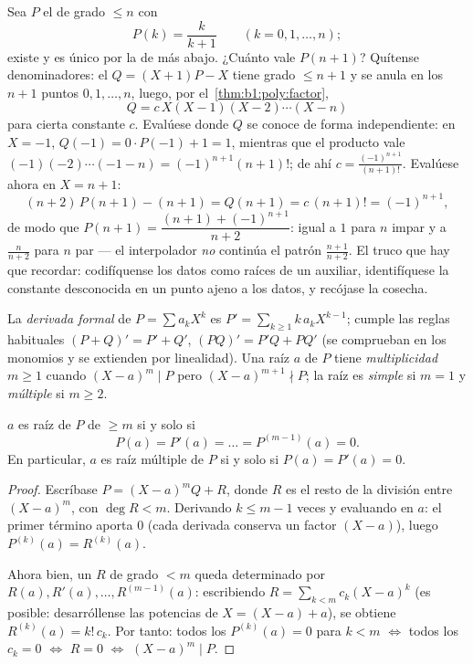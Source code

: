 \begin{example}\label{ex:b1:poly:auxiliary}
Sea $P$ el  de grado $\leq n$ con
\[
P(k) = \frac{k}{k+1} \qquad (k = 0, 1, \dots, n) ;
\]
existe y es único por la  de más abajo.
¿Cuánto vale $P(n+1)$? Quítense denominadores: el 
$Q = (X+1)P - X$ tiene grado $\leq n + 1$ y se anula en los $n + 1$
puntos $0, 1, \dots, n$, luego, por el~\cref{thm:b1:poly:factor},
\[
Q = c\,X(X-1)(X-2)\cdots(X-n)
\]
para cierta constante $c$. Evalúese donde $Q$ se conoce de forma
independiente: en $X = -1$, $Q(-1) = 0 \cdot P(-1) + 1 = 1$, mientras
que el producto vale $(-1)(-2)\cdots(-1-n) = (-1)^{n+1}(n+1)!$; de ahí
$c = \frac{(-1)^{n+1}}{(n+1)!}$. Evalúese ahora en $X = n + 1$:
\[
(n+2)\,P(n+1) - (n+1) = Q(n+1) = c\,(n+1)! = (-1)^{n+1} ,
\]
de modo que $P(n+1) = \dfrac{(n+1) + (-1)^{n+1}}{n+2}$: igual a $1$
para $n$ impar y a $\frac{n}{n+2}$ para $n$ par --- el 
interpolador \emph{no} continúa el patrón $\frac{n+1}{n+2}$. El truco
que hay que recordar: codifíquense los datos como raíces de un
 auxiliar, identifíquese la constante desconocida en un punto
ajeno a los datos, y recójase la cosecha.
\end{example}

\begin{definition}\label{def:b1:poly:derivative}
La \emph{derivada formal} de $P = \sum a_k X^k$ es
$P' = \sum_{k \geq 1} k\,a_k X^{k-1}$; cumple las reglas habituales
$(P+Q)' = P' + Q'$, $(PQ)' = P'Q + PQ'$ (se comprueban en los monomios
y se extienden por linealidad). Una raíz $a$ de $P$ tiene
\emph{multiplicidad} $m \geq 1$ cuando
$(X-a)^m \mid P$ pero $(X-a)^{m+1} \nmid P$; la raíz es \emph{simple}
si $m = 1$ y \emph{múltiple} si $m \geq 2$.
\end{definition}

\begin{proposition}\label{prop:b1:poly:multiplicity}
$a$ es raíz de $P$ de  $\geq m$ si y solo si
\[
P(a) = P'(a) = \dots = P^{(m-1)}(a) = 0 .
\]
En particular, $a$ es raíz múltiple de $P$ si y solo si
$P(a) = P'(a) = 0$.
\end{proposition}

\begin{proof}
Escríbase $P = (X - a)^m Q + R$, donde $R$ es el resto de la división
entre $(X-a)^m$, con $\deg R < m$. Derivando $k \leq m - 1$ veces y
evaluando en $a$: el primer término aporta $0$ (cada derivada conserva
un factor $(X-a)$), luego $P^{(k)}(a) = R^{(k)}(a)$.

Ahora bien, un  $R$ de grado $< m$ queda determinado por
$R(a), R'(a), \dots, R^{(m-1)}(a)$: escribiendo
$R = \sum_{k < m} c_k (X - a)^k$ (es posible: desarróllense las
potencias de $X = (X - a) + a$), se obtiene $R^{(k)}(a) = k!\, c_k$.
Por tanto: todos los $P^{(k)}(a) = 0$ para $k < m$ $\iff$ todos los
$c_k = 0$ $\iff$ $R = 0$ $\iff$ $(X-a)^m \mid P$.
\end{proof}

